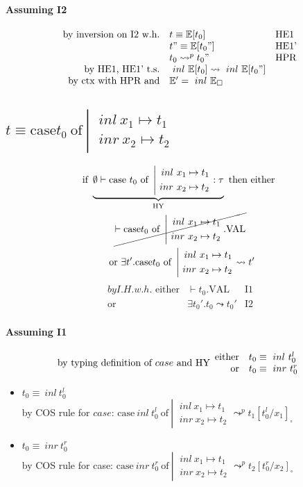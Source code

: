\documentclass{article}
\newcommand{\inl}[0]{\ensuremath{\ inl\ }}
\newcommand{\inr}[0]{\ensuremath{\ inr\ }}
\newcommand{\case}[3]{\ensuremath{\text{case}#1\ \text{of}\ \left|\begin{aligned}#2\\#3\end{aligned}\right.}}
\newcommand{\mE}[0]{\ensuremath{\mathbb{E}}}
\begin{document}
\paragraph{Assuming I2}
\[
    \begin{array}{rl @{\quad} l}
        \text{by inversion on I2 w.h.}   &  t \equiv \mE[t_0]         & \text{HE1}\\
                                         &  t" \equiv \mE[t_0"]        & \text{HE1'}\\
                                         &  t_0 \leadsto^p t_0"     & \text{HPR}\\
        \text{by HE1, HE1' t.s.}         &  \inl \mE[t_0] \leadsto \inl \mE[t_0"] \\
        \text{by ctx with HPR and}       &  \mE' = \inl \mE _\square \\
    \end{array}
\]

\subsection{$t \equiv \case{t_0}{\inl x_1 \mapsto t_1}{\inr x_2 \mapsto t_2}$}
\begin{multline*}
    \text{if } \underbrace{\emptyset \vdash \case{\ t_0}{\inl x_1 \mapsto t_1}{\inr x_2 \mapsto t_2}:\tau}_\text{HY} \text{ then either } \\ \cancel{ \vdash \case{t_0}{\inl x_1 \mapsto t_1}{\inr x_2 \mapsto t_2}.\text{VAL} } \\ \text{ or } \exists t'.\case{t_0}{\inl x_1 \mapsto t_1}{\inr x_2 \mapsto t_2}\leadsto t'
\end{multline*} 
\begin{align*}
    by I.H. w.h. \text{ either} & \vdash t_0.\text{VAL} & \text{I1}\\
    \text{or}                   & \exists t_0'.t_0\leadsto t_0' & \text{I2}
\end{align*}

\paragraph{Assuming I1}
\begin{equation*}
    \text{by typing definition of $case$ and HY}\begin{array}{r@{\quad}l} 
        \text{either} & t_0 \equiv \inl t_0^l \\
        \text{or}     & t_0 \equiv \inr t_0^r
    \end{array}
\end{equation*}
\begin{itemize}
    \item $t_0\equiv\inl t_0^l$ \\
            by COS rule for $case$: $\case{\inl t_0^l}{\inl x_1 \mapsto t_1}{\inr x_2 \mapsto t_2} \leadsto^p t_1[t_0^l/x_1]_\square$ \\

    \item $t_0\equiv\inr t_0^r$ \\
        by COS rule for case: $\case{\inr t_0^r}{\inl x_1 \mapsto t_1}{\inr x_2 \mapsto t_2} \leadsto^p t_2[t_0^r/x_2]_\square$
\end{itemize}
\end{document}
